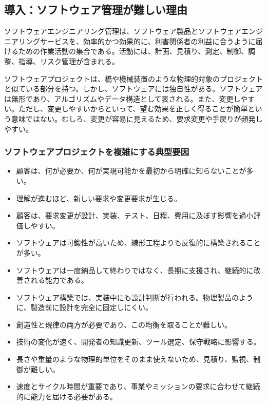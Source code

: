 \subsection{導入：ソフトウェア管理が難しい理由}
ソフトウェアエンジニアリング管理は、ソフトウェア製品とソフトウェアエンジニアリングサービスを、効率的かつ効果的に、利害関係者の利益に合うように届けるための作業活動の集合である。活動には、計画、見積り、測定、制御、調整、指導、リスク管理が含まれる。

ソフトウェアプロジェクトは、橋や機械装置のような物理的対象のプロジェクトと似ている部分を持つ。しかし、ソフトウェアには独自性がある。ソフトウェアは無形であり、アルゴリズムやデータ構造として表される。また、変更しやすい。ただし、変更しやすいからといって、望む効果を正しく得ることが簡単という意味ではない。むしろ、変更が容易に見えるため、要求変更や手戻りが頻発しやすい。

\subsubsection{ソフトウェアプロジェクトを複雑にする典型要因}
\begin{itemize}[leftmargin=2em]
  \item 顧客は、何が必要か、何が実現可能かを最初から明確に知らないことが多い。
  \item 理解が進むほど、新しい要求や変更要求が生じる。
  \item 顧客は、要求変更が設計、実装、テスト、日程、費用に及ぼす影響を過小評価しやすい。
  \item ソフトウェアは可鍛性が高いため、線形工程よりも反復的に構築されることが多い。
  \item ソフトウェアは一度納品して終わりではなく、長期に支援され、継続的に改善される能力である。
  \item ソフトウェア構築では、実装中にも設計判断が行われる。物理製品のように、製造前に設計を完全に固定しにくい。
  \item 創造性と規律の両方が必要であり、この均衡を取ることが難しい。
  \item 技術の変化が速く、開発者の知識更新、ツール選定、保守戦略に影響する。
  \item 長さや重量のような物理的単位をそのまま使えないため、見積り、監視、制御が難しい。
  \item 速度とサイクル時間が重要であり、事業やミッションの要求に合わせて継続的に能力を届ける必要がある。
\end{itemize}

